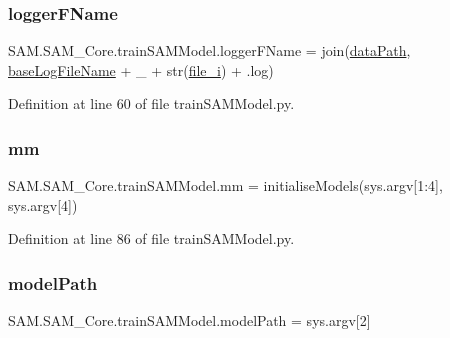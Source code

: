 \subsubsection{\texorpdfstring{logger\+F\+Name}{loggerFName}}
{\footnotesize\ttfamily S\+A\+M.\+S\+A\+M\+\_\+\+Core.\+train\+S\+A\+M\+Model.\+logger\+F\+Name = join(\hyperlink{namespaceSAM_1_1SAM__Core_1_1trainSAMModel_a227131024b77a9c68261ee558002e8c4}{data\+Path}, \hyperlink{namespaceSAM_1_1SAM__Core_1_1trainSAMModel_a6de46d6299824b843c610668a3d4e3d0}{base\+Log\+File\+Name} + \textquotesingle{}\+\_\+\textquotesingle{} + str(\hyperlink{namespaceSAM_1_1SAM__Core_1_1trainSAMModel_adabd782041187b40f1b3256100a40f18}{file\+\_\+i}) + \textquotesingle{}.log\textquotesingle{})}



Definition at line 60 of file train\+S\+A\+M\+Model.\+py.

\mbox{\label{namespaceSAM_1_1SAM__Core_1_1trainSAMModel_afc2414cf44fd68b8bfe50896cca60315}} 
\subsubsection{\texorpdfstring{mm}{mm}}
{\footnotesize\ttfamily S\+A\+M.\+S\+A\+M\+\_\+\+Core.\+train\+S\+A\+M\+Model.\+mm = initialise\+Models(sys.\+argv\mbox{[}1\+:4\mbox{]}, sys.\+argv\mbox{[}4\mbox{]})}



Definition at line 86 of file train\+S\+A\+M\+Model.\+py.

\mbox{\label{namespaceSAM_1_1SAM__Core_1_1trainSAMModel_a23d9f2671eb0af14906ea1e7e7d604b2}} 
\subsubsection{\texorpdfstring{model\+Path}{modelPath}}
{\footnotesize\ttfamily S\+A\+M.\+S\+A\+M\+\_\+\+Core.\+train\+S\+A\+M\+Model.\+model\+Path = sys.\+argv\mbox{[}2\mbox{]}}



